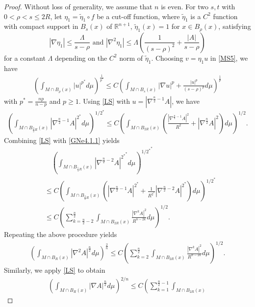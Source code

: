 \documentclass{amsart}
\theoremstyle{definition}
\numberwithin{equation}{section}
\begin{document}
\begin{proof}Without loss of generality, we assume that $n$ is even.
 For two $s, t$ with $0<\rho<s\leq 2R$,   let
$\eta_1 = \tilde \eta_1 \circ f$ be a cut-off function, where $\tilde
\eta_1$ is a $C^{2}$ function with compact support in $B_{s}(x)$  of $\mathbb{R}^{n+1}$,   $\tilde \eta_1 (x)=1$ for  $x\in
B_{\rho}(x)$, satisfying
$$\left| \nabla \eta_1\right| \leq \frac {\Lambda}{s-\rho} \mbox{ and } \left| \nabla^{2} \eta_1 \right| \leq \Lambda \left(\frac 1
{(s-\rho)^2}+\frac {
\left| A \right|}{s-\rho}
\right )
 $$
for a constant $\Lambda$ depending on the $C^{2}$ norm of $\tilde \eta_1$.
Choosing $v=\eta_1 u$ in \eqref{MS5}, we have
\begin{align}\label{LS}\left( \int_{ M \cap B_{\rho}(x)} |u|^{p^*} d\mu \right)^{\frac 1{p^*}}
\leq C \left( \int_{ M \cap B_{
s}(x)} \left| \nabla u\right|^p +\frac {|u|^p}{(s-\rho)^p}d\mu \right)^{\frac 1p }
\end{align}  with $p^*=\frac {np}{n-p}$ and $p\geq 1$.
 Using \eqref{LS} with $u=|\nabla^{\frac n 2-1}  A|$, we have
\begin{align}\label{GNe4.1.1}
\left (\int_{ M \cap B_{\frac 32 R}(x)}  |\nabla^{\frac n 2-1}  A|^{2^*}  d\mu\right )^{1/2^*}
\leq C\left ( \int_{ M \cap B_{2R}(x)} (\frac { |\nabla^{\frac n 2 -1}  A|^2 }{R^2}+    |\nabla^{\frac n 2}  A|^2)   d\mu\right )^{1/2}.
\end{align}
 Combining \eqref{LS} with \eqref{GNe4.1.1} yields
\begin{align}\label{GNe4.2}
&\quad\left (\int_{M \cap B_{\frac 54 R}(x)}  |\nabla^{\frac n 2-2}  A|^{{2^*}^*}  d\mu\right )^{1/{2^*}^*}\\
&\leq C\left (\int_{ M \cap B_{\frac 32 R}(x)} \left ( |\nabla^{\frac n 2-1}  A|^{2^*}+\frac 1{ R^{2^*}}|\nabla^{\frac n 2-2}  A|^{2^*}
\right )   d\mu\right )^{1/2^*} \nonumber\\
& \leq C\left (\sum_{k= \frac n2-2}^{\frac n 2} \int_{  M \cap B_{2R}(x)}
\frac { |\nabla^{k}  A|^2 }{R^{ n-2k}} d\mu\right )^{1/2}.\nonumber
\end{align}
Repeating  the above  procedure yields
\begin{align}\label{GNe4.3}
\left (\int_{M \cap B_{R}(x)}  |\nabla^2  A|^{\frac n 2}  d\mu\right )^{\frac 2n}\leq C\left (\sum_{k=2}^{\frac n 2} \int_{M \cap B_{2R}(x)}
\frac { |\nabla^{k}  A|^2 }{R^{ n-2k}} d\mu\right )^{1/2}.
\end{align}
Similarly, we apply \eqref{LS} to obtain
\begin{align}\label{GNe4.4}
\left (\int_{ M \cap B_{R}(x)}  |\nabla   A|^{\frac n 2}  d\mu\right )^{2/n}\leq C\left (\sum_{k=1}^{\frac n 2-1} \int_{ M \cap B_{2R}(x)}

\end{align}
\end{proof}
\end{document}
